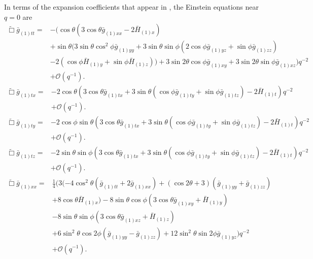 \documentclass[12pt]{iopart}
\begin{document}
In terms of the expansion coefficients that appear in , the Einstein equations near $q=0$ are
\begin{eqnarray}\label{eqn:efett}
\tilde{\Box}\bar{g}_{(1)tt}=&-(\cos \theta (3 \cos \theta  \bar{g}_{(1)xx}-2 \bar{H}_{(1)x}) \nonumber \\
&+\sin\theta (3 \sin \theta \cos^2\phi \bar{g}_{(1) yy}+3
   \sin \theta  \sin \phi (2 \cos \phi  \bar{g}_{(1) yz}+\sin\phi
   \bar{g}_{(1) zz}) \nonumber \\
   &-2 (\cos \phi \bar{H}_{(1) y}+\sin\phi
   \bar{H}_{(1) z}))+3 \sin 2 \theta  \cos \phi \bar{g}_{(1) xy}+3
   \sin 2 \theta  \sin \phi \bar{g}_{(1) xz})q^{-2} \nonumber \\
&+\mathcal{O}(q^{-1}).
\end{eqnarray}
\begin{eqnarray}\label{eqn:efetx}
\tilde{\Box}\bar{g}_{(1)tx}=&-2 \cos \theta (3 \cos\theta \bar{g}_{(1) tx}+3 \sin \theta
   (\cos \phi  \bar{g}_{(1) ty}+\sin \phi  \bar{g}_{(1)tz})-2
   \bar{H}_{(1) t})    q^{-2} \nonumber \\
&+\mathcal{O}(q^{-1}).
\end{eqnarray}
\begin{eqnarray}\label{eqn:efety}
\tilde{\Box}\bar{g}_{(1)ty}=&-2 \cos \phi \sin\theta (3 \cos\theta \bar{g}_{(1) tx}+3 \sin \theta
   (\cos \phi  \bar{g}_{(1) ty}+\sin \phi  \bar{g}_{(1)tz})-2
   \bar{H}_{(1) t})    q^{-2} \nonumber \\
&+\mathcal{O}(q^{-1}).
\end{eqnarray}
\begin{eqnarray}\label{eqn:efetz}
\tilde{\Box}\bar{g}_{(1)tz}=&-2 \sin \theta \sin\phi (3 \cos\theta \bar{g}_{(1) tx}+3 \sin \theta
   (\cos \phi \bar{g}_{(1) ty}+\sin \phi  \bar{g}_{(1)tz})-2
   \bar{H}_{(1) t})    q^{-2} \nonumber \\
&+\mathcal{O}(q^{-1}).
\end{eqnarray}
\begin{eqnarray}\label{eqn:efexx}
\tilde{\Box}\bar{g}_{(1)xx}=&\frac{1}{4} (3 (-4 \cos ^2\theta (\bar{g}_{(1) tt}+2 \bar{g}_{(1)
   xx})+(\cos 2 \theta +3) (\bar{g}_{(1) yy}+\bar{g}_{(1)
zz}) \nonumber \\
&+8 \cos \theta  \bar{H}_{(1) x})-8 \sin \theta  \cos \phi 
   (3 \cos \theta  \bar{g}_{(1)xy}+\bar{H}_{(1) y}) \nonumber \\
   &-8 \sin\theta \sin\phi (3 \cos\theta \bar{g}_{(1) xz}+\bar{H}_{(1) z}) \nonumber \\
   &+6 \sin^2\theta  \cos 2 \phi  (\bar{g}_{(1)yy}-\bar{g}_{(1)zz})+12
   \sin^2\theta  \sin 2 \phi  \bar{g}_{(1) yz})    q^{-2} \nonumber \\
&+\mathcal{O}(q^{-1}).
\end{eqnarray}
\end{document}
